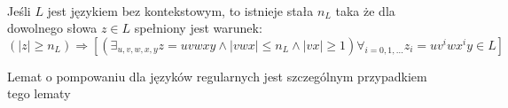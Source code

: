 	\begin{lemat}~\\
		Jeśli $L$ jest językiem bez kontekstowym, to istnieje stała $n_L$ taka że dla
		dowolnego słowa $z\in L$ spełniony jest warunek:
		\begin{equation}
			(|z| \geqslant n_L) \Rightarrow [( \exists_{u,v,w,x,y} z = uvwxy \wedge |vwx| \leqslant n_L \wedge |vx| \geqslant 1) \forall_{i=0,1,\dots} z_i = uv^iwx^iy \in L]
		\end{equation}
		\begin{uwaga}
			Lemat o pompowaniu dla języków regularnych jest szczególnym przypadkiem tego lematy
		\end{uwaga}
		

\end{lemat}
